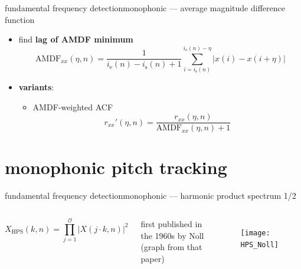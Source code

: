 	\begin{frame}{fundamental frequency detection}{monophonic --- average magnitude difference function}
        \begin{itemize}
            \item find \textbf{lag of AMDF minimum}
                \begin{equation*}
                    \mathrm{AMDF}_{xx}(\eta,n) = \frac{1}{i_{\mathrm{e}}(n)-i_{\mathrm{s}}(n)+1}\sum\limits_{i=i_{\mathrm{s}}(n)}^{i_{\mathrm{e}}(n)-\eta}{|x(i)- x(i+\eta)|} 
                \end{equation*}
            \item<2-> \textbf{variants}:
                \begin{itemize}
                    \item	AMDF-weighted ACF
                        \begin{equation*}
                            r_{xx}'(\eta,n) = \frac{r_{xx}(\eta,n)}{\mathrm{AMDF}_{xx}(\eta,n) + 1} 
                        \end{equation*}
                \end{itemize}
        \end{itemize}
	\end{frame}
	
    \section[frequency domain]{monophonic pitch tracking}
	\begin{frame}{fundamental frequency detection}{monophonic --- harmonic product spectrum 1/2}
        \vspace{-15mm}
        \begin{columns}
                \vspace{4mm}
                \begin{equation*}\label{eq:hps}
                    X_{\mathrm{HPS}}(k,n) = \prod\limits_{j=1}^{\mathcal{O}}{|X(j\cdot k,n)|^2}
                \end{equation*}
                
                first published in the 1960s by Noll (graph from that paper)
				\begin{figure}
                    \texttt{[image: HPS\_Noll]}
                \end{figure}
		\end{columns}
        \vspace{-5mm}
	\end{frame}
	
